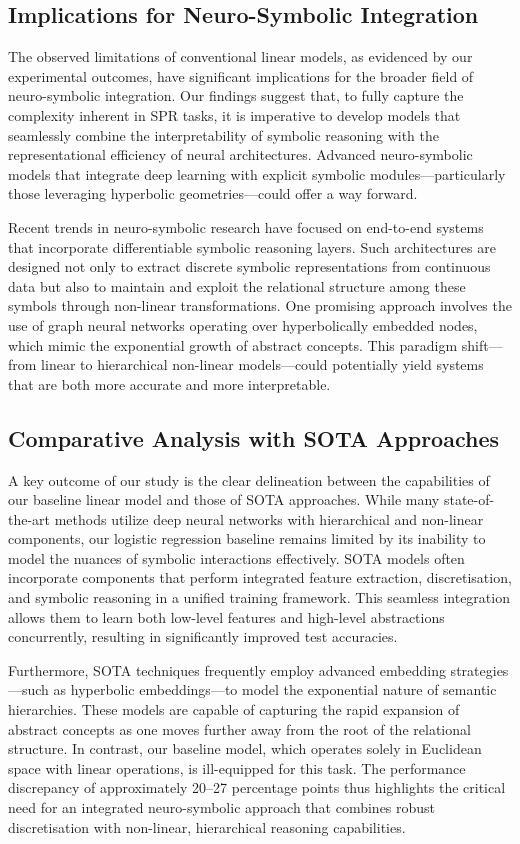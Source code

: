 \documentclass{article}
\begin{document}
\subsection{Implications for Neuro-Symbolic Integration}
The observed limitations of conventional linear models, as evidenced by our experimental outcomes, have significant implications for the broader field of neuro-symbolic integration. Our findings suggest that, to fully capture the complexity inherent in SPR tasks, it is imperative to develop models that seamlessly combine the interpretability of symbolic reasoning with the representational efficiency of neural architectures. Advanced neuro-symbolic models that integrate deep learning with explicit symbolic modules—particularly those leveraging hyperbolic geometries—could offer a way forward.

Recent trends in neuro-symbolic research have focused on end-to-end systems that incorporate differentiable symbolic reasoning layers. Such architectures are designed not only to extract discrete symbolic representations from continuous data but also to maintain and exploit the relational structure among these symbols through non-linear transformations. One promising approach involves the use of graph neural networks operating over hyperbolically embedded nodes, which mimic the exponential growth of abstract concepts. This paradigm shift—from linear to hierarchical non-linear models—could potentially yield systems that are both more accurate and more interpretable.

\subsection{Comparative Analysis with SOTA Approaches}
A key outcome of our study is the clear delineation between the capabilities of our baseline linear model and those of SOTA approaches. While many state-of-the-art methods utilize deep neural networks with hierarchical and non-linear components, our logistic regression baseline remains limited by its inability to model the nuances of symbolic interactions effectively. SOTA models often incorporate components that perform integrated feature extraction, discretisation, and symbolic reasoning in a unified training framework. This seamless integration allows them to learn both low-level features and high-level abstractions concurrently, resulting in significantly improved test accuracies.

Furthermore, SOTA techniques frequently employ advanced embedding strategies—such as hyperbolic embeddings—to model the exponential nature of semantic hierarchies. These models are capable of capturing the rapid expansion of abstract concepts as one moves further away from the root of the relational structure. In contrast, our baseline model, which operates solely in Euclidean space with linear operations, is ill-equipped for this task. The performance discrepancy of approximately 20--27 percentage points thus highlights the critical need for an integrated neuro-symbolic approach that combines robust discretisation with non-linear, hierarchical reasoning capabilities.
\end{document}
